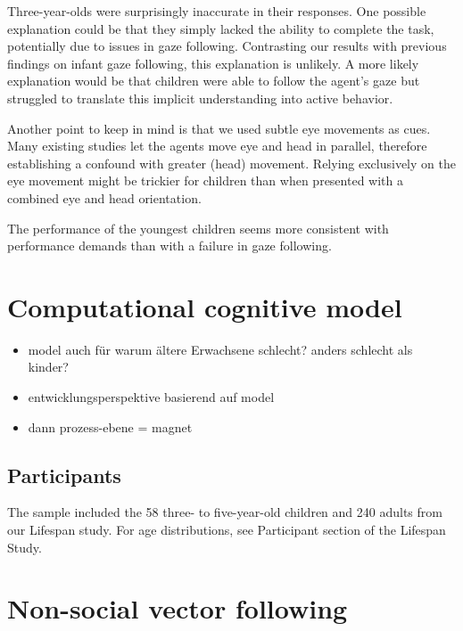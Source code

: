 \documentclass[
  man,floatsintext]{apa6}
\providecommand{\tightlist}{%
  \setlength{\itemsep}{0pt}\setlength{\parskip}{0pt}}
\begin{document}
Three-year-olds were surprisingly inaccurate in their responses.
One possible explanation could be that they simply lacked the ability to complete the task, potentially due to issues in gaze following.
Contrasting our results with previous findings on infant gaze following, this explanation is unlikely.
A more likely explanation would be that children were able to follow the agent's gaze but struggled to translate this implicit understanding into active behavior.

Another point to keep in mind is that we used subtle eye movements as cues.
Many existing studies let the agents move eye and head in parallel, therefore establishing a confound with greater (head) movement.
Relying exclusively on the eye movement might be trickier for children than when presented with a combined eye and head orientation.

The performance of the youngest children seems more consistent with performance demands than with a failure in gaze following.

\hypertarget{computational-cognitive-model}{%
\section{Computational cognitive model}\label{computational-cognitive-model}}

\begin{itemize}
\tightlist
\item
  model auch für warum ältere Erwachsene schlecht? anders schlecht als kinder?
\item
  entwicklungsperspektive basierend auf model
\item
  dann prozess-ebene = magnet
\end{itemize}

\hypertarget{participants-1}{%
\subsection{Participants}\label{participants-1}}

The sample included the 58 three- to five-year-old children and 240 adults from our Lifespan study. For age distributions, see Participant section of the Lifespan Study.

\hypertarget{non-social-vector-following}{%
\section{Non-social vector following}\label{non-social-vector-following}}
\end{document}

